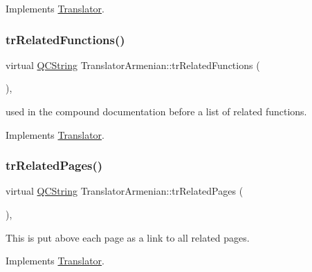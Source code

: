 Implements \mbox{\hyperlink{class_translator}{Translator}}.

\mbox{\label{class_translator_armenian_a0e810d7353510b20cb8529689c81344f}} 
\subsubsection{\texorpdfstring{trRelatedFunctions()}{trRelatedFunctions()}}
{\footnotesize\ttfamily virtual \mbox{\hyperlink{class_q_c_string}{Q\+C\+String}} Translator\+Armenian\+::tr\+Related\+Functions (\begin{DoxyParamCaption}{ }\end{DoxyParamCaption})\hspace{0.3cm}{\ttfamily [inline]}, {\ttfamily [virtual]}}

used in the compound documentation before a list of related functions. 

Implements \mbox{\hyperlink{class_translator}{Translator}}.

\mbox{\label{class_translator_armenian_ac5408603c8a3d0e9170f1ea061c1c220}} 
\subsubsection{\texorpdfstring{trRelatedPages()}{trRelatedPages()}}
{\footnotesize\ttfamily virtual \mbox{\hyperlink{class_q_c_string}{Q\+C\+String}} Translator\+Armenian\+::tr\+Related\+Pages (\begin{DoxyParamCaption}{ }\end{DoxyParamCaption})\hspace{0.3cm}{\ttfamily [inline]}, {\ttfamily [virtual]}}

This is put above each page as a link to all related pages. 

Implements \mbox{\hyperlink{class_translator}{Translator}}.

\mbox{\label{class_translator_armenian_a2634f34047a644ab89efa6a7339bf42a}} 
